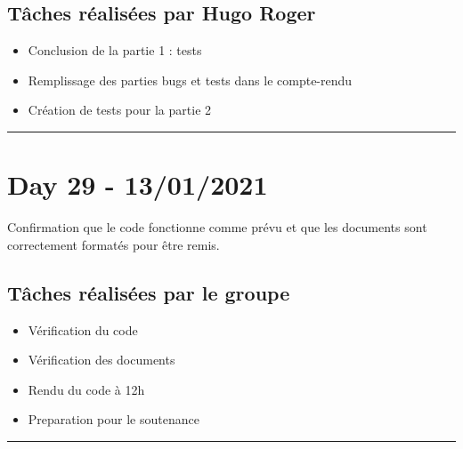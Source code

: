 \documentclass[11pt,letterpaper]{article}
\begin{document}
\subsection*{Tâches réalisées par Hugo Roger}
\begin{itemize}
    \item Conclusion de la partie 1 : tests
    \item Remplissage des parties bugs et tests dans le compte-rendu
    \item Création de tests pour la partie 2
\end{itemize}

\noindent\rule{13cm}{0.4pt}

\section*{Day 29 - 13/01/2021}
Confirmation que le code fonctionne comme prévu et que les documents sont 
correctement formatés pour être remis.

\subsection*{Tâches réalisées par le groupe}
\begin{itemize}
    \item Vérification du code
    \item Vérification des documents
    \item Rendu du code à 12h
    \item Preparation pour le soutenance
\end{itemize}

\noindent\rule{13cm}{0.4pt}

\end{document}
